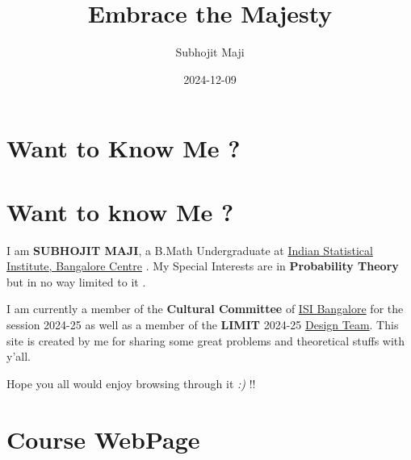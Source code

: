 \documentclass[
  letterpaper,
  DIV=11,
  numbers=noendperiod]{scrreprt}
\title{Embrace the Majesty}
\author{Subhojit Maji}
\date{2024-12-09}
\begin{document}
\maketitle



\chapter{Want to Know Me ?}\label{want-to-know-me}


\chapter*{Want to know Me ?}\label{want-to-know-me-1}


I am \textbf{SUBHOJIT MAJI}, a B.Math Undergraduate at
\href{https://www.isibang.ac.in/}{Indian Statistical Institute,
Bangalore Centre} . My Special Interests are in \textbf{Probability
Theory} but in no way limited to it .

I am currently a member of the \textbf{Cultural Committee} of
\href{https://www.isibang.ac.in/}{ISI Bangalore} for the session 2024-25
as well as a member of the \textbf{LIMIT} 2024-25
\href{https://www.limitisi.in/resources/team/design}{Design Team}. This
site is created by me for sharing some great problems and theoretical
stuffs with y'all.

Hope you all would enjoy browsing through it \emph{:)} !!


\chapter{Course WebPage}\label{course-webpage}
\end{document}
